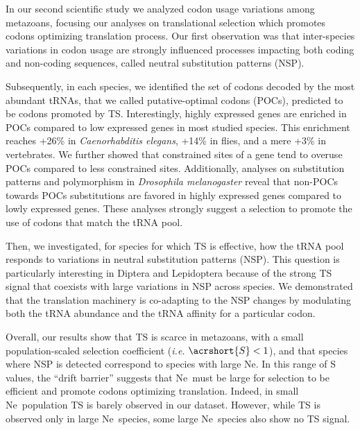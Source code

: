 In our second scientific study we analyzed \gls{codon usage} variations among metazoans, focusing our analyses on \gls{translational selection} which promotes codons optimizing translation process. Our first observation was that inter-species variations in \gls{codon usage} are strongly influenced processes impacting both coding and non-coding sequences, called neutral \gls{substitution} patterns (\acrshort{NSP}). 

Subsequently, in each species, we identified the set of \gls{codon}s decoded by the most abundant \acrshort{tRNA}s, that we called putative-optimal codons (\acrshort{POC}s), predicted to be codons promoted by \acrshort{TS}. Interestingly, highly expressed genes are enriched in \acrshort{POC}s compared to low expressed genes in most studied species. This enrichment reaches +26\% in \textit{Caenorhabditis elegans}, +14\% in flies, and a mere +3\% in vertebrates. We further showed that constrained sites of a gene tend to overuse \acrshort{POC}s compared to less constrained sites. Additionally, analyses on substitution patterns and polymorphism in \textit{Drosophila melanogaster} reveal that non-\acrshort{POC}s towards \acrshort{POC}s \gls{substitution}s are favored in highly expressed genes compared to lowly expressed genes. These analyses strongly suggest a selection to promote the use of codons that match the \acrshort{tRNA} pool. 

Then, we investigated, for species for which \acrshort{TS} is effective, how the \acrshort{tRNA} pool responds to variations in neutral substitution patterns (\acrshort{NSP}). This question is particularly interesting in Diptera and Lepidoptera because of the strong \acrshort{TS} signal that coexists with large variations in \acrshort{NSP} across species. We demonstrated that the translation machinery is co-adapting to the \acrshort{NSP} changes by modulating both the \acrshort{tRNA} abundance and the \acrshort{tRNA} affinity for a particular \gls{codon}.

Overall, our results show that \acrshort{TS} is scarce in metazoans, with a small population-scaled selection coefficient (\textit{i.e.} $\acrshort{S} < 1$), and that species where \acrshort{NSP} is detected correspond to species with large \acrshort{Ne}. In this range of \acrshort{S} values, the “drift barrier” suggests that \acrshort{Ne}~must be large for selection to be efficient and promote codons optimizing translation. Indeed, in small \acrshort{Ne}~population \acrshort{TS} is barely observed in our dataset. However, while \acrshort{TS} is observed only in large \acrshort{Ne}~species, some large \acrshort{Ne}~species also show no \acrshort{TS} signal.

